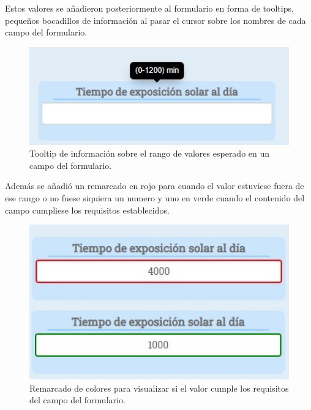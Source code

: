 Estos valores se añadieron posteriormente al formulario en forma de tooltips, pequeños bocadillos de información al pasar el cursor sobre los nombres de cada campo del formulario.

\begin{figure}[h]
    \centering
     \includegraphics[width=1\textwidth]{images/tooltip.jpg}
    \caption{Tooltip de información sobre el rango de valores esperado en un campo del formulario.}
\end{figure}

Además se añadió un remarcado en rojo para cuando el valor estuviese fuera de ese rango o no fuese siquiera un numero y uno en verde cuando el contenido del campo cumpliese los requisitos establecidos.

\begin{figure}[h]
    \centering
     \includegraphics[width=1\textwidth]{images/remarcadoRojo.jpg}
    \caption{Remarcado de colores para visualizar si el valor cumple los requisitos del campo del formulario.}
\end{figure}